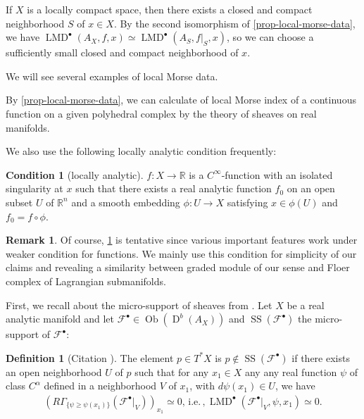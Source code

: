 \documentclass[a4paper,dvipdfmx,reqno,12pt]{amsart}
\theoremstyle{definition}
\newtheorem{definition}[theorem]{Definition}
\newtheorem{remark}[theorem]{Remark}
\newtheorem{condition}[theorem]{Condition}
\newcommand{\mcal}[1]{\mathcal{#1}}%
\newcommand{\opn}[1]{\operatorname{#1}}
\numberwithin{equation}{section}
\begin{document}
If $X$ is a locally compact space, then there exists a 
closed and compact neighborhood $S$ of $x\in X$. 
By the second isomorphism of \cref{prop-local-morse-data},
we have 
$\opn{LMD}^{\bullet}(A_X,f,x)\simeq 
\opn{LMD}^{\bullet}(A_S,f|_S,x)$, so 
we can choose a sufficiently small closed and 
compact neighborhood 
of $x$. 



We will see several examples of local Morse data.






By \cref{prop-local-morse-data}, we can calculate
of local Morse index of a continuous function on 
a given polyhedral complex by the theory of sheaves on 
real manifolds.



We also use the following locally analytic 
condition frequently:

\begin{condition}[{locally analytic}]
\label{condition-local-analytic}
$f\colon X\to \mathbb{R}$ is a $C^{\infty}$-function
with an isolated singularity at $x$ such that 
there exists a real analytic function $f_0$ on an open 
subset $U$ of $\mathbb{R}^{n}$ and a smooth embedding
$\phi \colon U\to X$ satisfying $x\in \phi(U)$ and
$f_0=f\circ \phi$.
\end{condition}

\iffalse
\begin{definition}

\end{definition}
\fi


\begin{remark}
Of course, \cref{condition-local-analytic} is tentative
since various important
features work under weaker condition for functions. 
We mainly use this condition for
simplicity of our claims and revealing a similarity between
graded module of our sense and Floer complex of Lagrangian 
submanifolds.
\end{remark}

First, we recall about the micro-support of sheaves 
from \cite{MR1299726}.
Let $X$ be a real analytic manifold and let
$\mcal{F}^{\bullet}\in\opn{Ob}(\opn{D}^{b}(A_X))$ and
$\opn{SS}(\mcal{F}^{\bullet})$ 
the micro-support of $\mcal{F}^{\bullet}$:
\begin{definition}[{Citation 
\cite[Definition 5.1.2]{MR1299726}}]
The element $p\in T^{*}X$ 
is  $p\notin \opn{SS}(\mathcal{F}^{\bullet})$
if there exists an open neighborhood $U$ of $p$ such 
that for any $x_1\in X$ any any real 
function $\psi$ of class $C^{\alpha}$ defined 
in a neighborhood $V$ of $x_1$, with 
$d\psi(x_1)\in U$, we have
\begin{align}
(R\Gamma_{\{\psi \geq \psi(x_1)\}}(\mathcal{F}^{\bullet}|_V))_{x_1}
\simeq 0,\, \mathrm{i.e.} \, , 
\opn{LMD}^{\bullet}(\mathcal{F}^{\bullet}|_V,\psi,x_1)
\simeq 0.
\end{align}

\end{definition}
\end{document}
